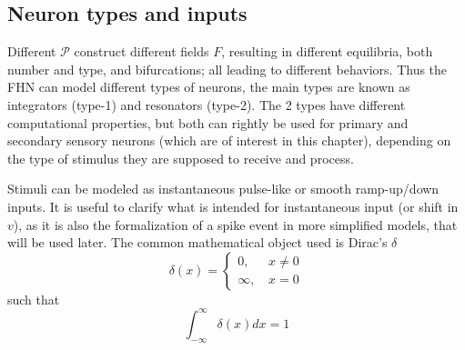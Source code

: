 \subsection{Neuron types and inputs}
Different $\mathcal{P}$ construct different fields $F$, resulting in different equilibria, both number and type, and bifurcations; all leading to different behaviors. 
Thus the FHN can model different types of neurons, the main types are known as integrators (type-1) and resonators (type-2). 
The 2 types have different computational properties, but both can rightly be used for primary and secondary sensory neurons (which are of interest in this chapter), depending on the type of stimulus they are supposed to receive and process.


Stimuli can be modeled as instantaneous pulse-like or smooth ramp-up/down inputs.
It is useful to clarify what is intended for instantaneous input (or shift in $v$), as it is also the formalization of a spike event in more simplified models, that will be used later. 
The common mathematical object used is Dirac's $\delta$
\begin{equation}
    \delta (x) =
    \begin{cases}
        0 \text{, } &x \neq 0\\
        \infty \text{, } &x = 0
    \end{cases}
\end{equation}
such that 
\begin{equation}
    \int_{-\infty}^{\infty} \delta (x) dx = 1
\end{equation}

